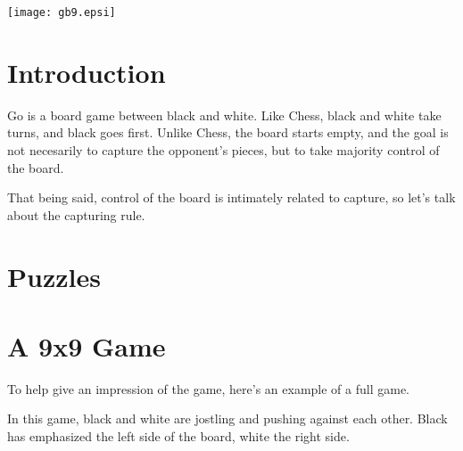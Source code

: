 \documentclass{article}
\begin{document}
\hbox{}
\vfill

\begin{center}
\texttt{[image: gb9.epsi]}
\end{center}

\vfill

\newpage

\section*{Introduction}
Go is a board game between black and white.  Like Chess, black and
white take turns, and black goes first.  Unlike Chess, the board
starts empty, and the goal is not necesarily to capture the opponent's
pieces, but to take majority control of the board.

That being said, control of the board is intimately related to
capture, so let's talk about the capturing rule.




\section*{Puzzles}

\section*{A 9x9 Game}
To help give an impression of the game, here's an example of a full game.
%
\begin{center}
\hspace{1in}%
\hspace{1in}%
\end{center}
%
In this game, black and white are jostling and pushing against each
other.  Black has emphasized the left side of the board, white the
right side.
\end{document}
